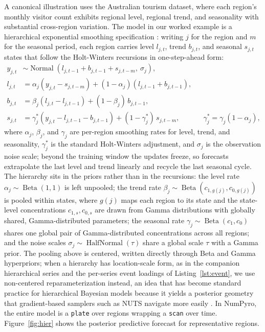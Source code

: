 \documentclass[11pt,3p,review,authoryear]{elsarticle}
\begin{document}
A canonical illustration uses the Australian tourism dataset, where each region's monthly visitor count exhibits regional level, regional trend, and seasonality with substantial cross-region variation. The model in our worked example is a hierarchical exponential smoothing specification \citep{orduz_hierarchical_exp, orduz_hierarchical_1}: writing $j$ for the region and $m$ for the seasonal period, each region carries level $l_{j,t}$, trend $b_{j,t}$, and seasonal $s_{j,t}$ states that follow the Holt-Winters recursions in one-step-ahead form:
\begin{align}
y_{j,t} &\sim \operatorname{Normal}(l_{j,t-1} + b_{j,t-1} + s_{j,t-m},\ \sigma_j), \nonumber\\
l_{j,t} &= \alpha_j (y_{j,t} - s_{j,t-m}) + (1-\alpha_j)(l_{j,t-1} + b_{j,t-1}), \nonumber\\
b_{j,t} &= \beta_j (l_{j,t} - l_{j,t-1}) + (1-\beta_j)\, b_{j,t-1}, \nonumber\\
s_{j,t} &= \gamma_j^{*} (y_{j,t} - l_{j,t-1} - b_{j,t-1}) + (1-\gamma_j^{*})\, s_{j,t-m}, && \gamma_j^{*} = \gamma_j (1-\alpha_j), \nonumber
\end{align}
where $\alpha_j$, $\beta_j$, and $\gamma_j$ are per-region smoothing rates for level, trend, and seasonality, $\gamma_j^{*}$ is the standard Holt-Winters adjustment, and $\sigma_j$ is the observation noise scale; beyond the training window the updates freeze, so forecasts extrapolate the last level and trend linearly and recycle the last seasonal cycle. The hierarchy sits in the priors rather than in the recursions: the level rate $\alpha_j \sim \operatorname{Beta}(1,1)$ is left unpooled; the trend rate $\beta_j \sim \operatorname{Beta}(c_{1,g(j)}, c_{0,g(j)})$ is pooled within states, where $g(j)$ maps each region to its state and the state-level concentrations $c_{1,s}, c_{0,s}$ are drawn from Gamma distributions with globally shared, Gamma-distributed parameters; the seasonal rate $\gamma_j \sim \operatorname{Beta}(c_1, c_0)$ shares one global pair of Gamma-distributed concentrations across all regions; and the noise scales $\sigma_j \sim \operatorname{HalfNormal}(\tau)$ share a global scale $\tau$ with a Gamma prior. The pooling above is centered, written directly through Beta and Gamma hyperpriors; when a hierarchy has location-scale form, as in the companion hierarchical series \citep{orduz_hierarchical_1, orduz_hierarchical_2, orduz_hierarchical_3} and the per-series event loadings of Listing~\ref{lst:event}, we use non-centered reparameterization instead, an idea that has become standard practice for hierarchical Bayesian models because it yields a posterior geometry that gradient-based samplers such as NUTS navigate more easily \citep{gorinova2019automatic}. In NumPyro, the entire model is a \texttt{plate} over regions wrapping a \texttt{scan} over time. Figure~\ref{fig:hier} shows the posterior predictive forecast for representative regions.
\end{document}
